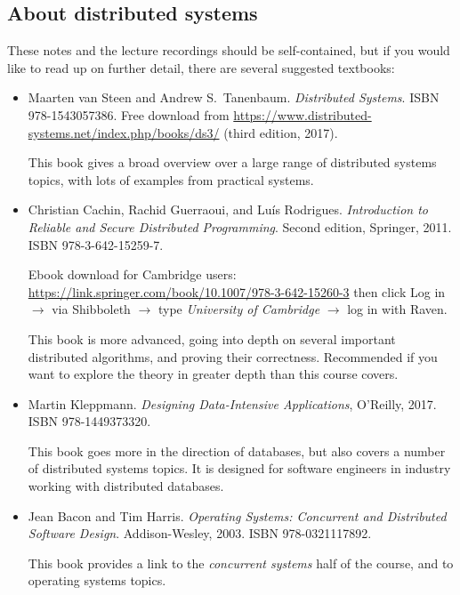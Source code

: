 \subsection{About distributed systems}\label{sec:about}

These notes and the lecture recordings should be self-contained, but if you would like to read up on further detail, there are several suggested textbooks:
\begin{itemize}
    \item Maarten van Steen and Andrew S.\ Tanenbaum. \emph{Distributed Systems}. ISBN 978-1543057386.
        Free download from \url{https://www.distributed-systems.net/index.php/books/ds3/} (third edition, 2017).

        This book gives a broad overview over a large range of distributed systems topics, with lots of examples from practical systems.

    \item Christian Cachin, Rachid Guerraoui, and Luís Rodrigues.
        \emph{Introduction to Reliable and Secure Distributed Programming}.
        Second edition, Springer, 2011. ISBN 978-3-642-15259-7.

        Ebook download for Cambridge users: \url{https://link.springer.com/book/10.1007/978-3-642-15260-3} then click Log in $\rightarrow$ via Shibboleth $\rightarrow$ type \emph{University of Cambridge} $\rightarrow$ log in with Raven.

        This book is more advanced, going into depth on several important distributed algorithms, and proving their correctness.
        Recommended if you want to explore the theory in greater depth than this course covers.

    \item Martin Kleppmann. \emph{Designing Data-Intensive Applications}, O'Reilly, 2017. ISBN 978-1449373320.

        This book goes more in the direction of databases, but also covers a number of distributed systems topics.
        It is designed for software engineers in industry working with distributed databases.

    \item Jean Bacon and Tim Harris. \emph{Operating Systems: Concurrent and Distributed Software Design}.
        Addison-Wesley, 2003. ISBN 978-0321117892.

        This book provides a link to the \emph{concurrent systems} half of the course, and to operating systems topics.
\end{itemize}

